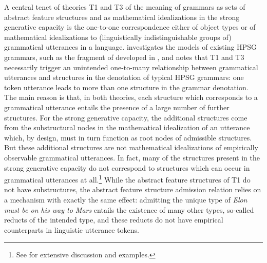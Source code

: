 \documentclass[output=paper
 	        ,biblatex
                ,babelshorthands
                ,newtxmath
                ,draftmode
                ,colorlinks, citecolor=brown
]{langscibook}
\begin{document}
{A central tenet of theories T1 and T3 of the meaning of grammars as
sets of abstract feature structures and as mathematical idealizations
in the strong generative capacity is the one-to-one
correspondence either of object types or of mathematical idealizations
to (linguistically indistinguishable groups of) grammatical utterances
in a language. \citet{Richter2007a}
investigates the models of existing HPSG grammars, such as the fragment
of  developed in , and notes that
T1 and T3 necessarily trigger an unintended one-to-many
relationship between grammatical utterances and structures in the
denotation of typical HPSG grammars: one token utterance leads to more than one
structure in the grammar denotation. The main reason
is that, in both theories, each structure which corresponds
to a grammatical utterance entails the presence of a large
number of further structures. For the strong generative capacity,
the additional structures come from the substructural nodes in the
mathematical idealization of an utterance which, by design, must
in turn function as root nodes of admissible structures. But these additional
structures are not mathematical idealizations of empirically
observable grammatical utterances. In fact, many of the structures
present in the strong generative capacity do not correspond to
structures which can occur in grammatical utterances at all.\footnote{See
   for extensive discussion and 
  examples.} While the abstract feature structures
of T1 do not have substructures, the abstract feature structure admission
relation relies on a mechanism with exactly the same effect: admitting
the unique type of \emph{Elon must be on his way to Mars} entails the existence
of many other types, so-called reducts of the intended
type, and these reducts do not have empirical counterparts in linguistic
utterance tokens.



}
\end{document}
